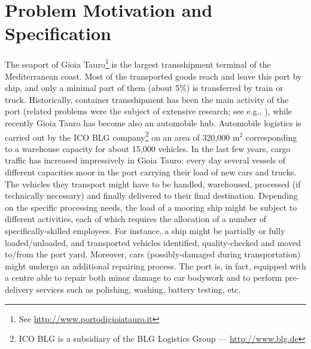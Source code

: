 \documentclass{tlp}
\begin{document}
\section{Problem Motivation and Specification}\label{sec:domain}
The seaport of Gioia Tauro\footnote{See \url{http://www.portodigioiatauro.it}}
is the largest
transshipment terminal of the Mediterranean coast.
Most of the transported goods reach and leave this port by ship,
and only a minimal part of them (about 5\%) is transferred by train or truck.
Historically, container transshipment has been the main activity of the port
(related problems were the subject of extensive research; see e.g., ),
while  recently Gioia Tauro has become also an automobile hub.
Automobile logistics is carried out by the ICO BLG company\footnote{ICO BLG is a subsidiary of the BLG Logistics Group --- \url{http://www.blg.de}}
on an area of  320,000 m$^2$ corresponding to a warehouse capacity for about 15,000 vehicles.
In the last few years, cargo traffic has increased impressively in Gioia Tauro:
every day several vessels of different capacities moor in the port carrying their load of new cars and trucks.
The vehicles they transport might have to be handled, warehoused, processed
(if technically necessary) and finally delivered to their final destination.
Depending on the specific processing needs, the load of a mooring ship might be subject
to different activities,  each of which requires the allocation of a number of specifically-skilled employees.
For instance, a ship might be partially or fully loaded/unloaded,
and transported vehicles identified, quality-checked and moved to/from the port yard.
Moreover, cars (possibly-damaged during transportation) might undergo an additional repairing
process. The port is, in fact, equipped with a centre able
to repair both minor damage to car bodywork and to perform
pre-delivery services such as polishing, washing, battery testing, etc.
\end{document}
